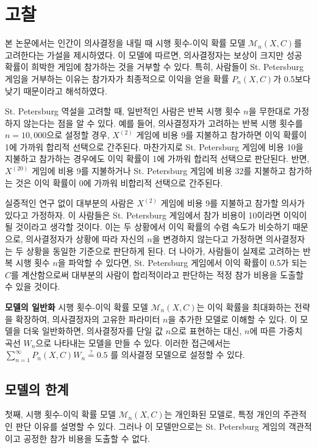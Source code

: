 \chapter{고찰}

본 논문에서는 인간이 의사결정을 내릴 때 시행 횟수-이익 확률 모델 $\mathcal{M}_n(X, C)$를 고려한다는 가설을 제시하였다. 이 모델에 따르면, 의사결정자는 보상이 크지만 성공 확률이 희박한 게임에 참가하는 것을 거부할 수 있다. 특히, 사람들이 St. Petersburg 게임을 거부하는 이유는 참가자가 최종적으로 이익을 얻을 확률 $P_n(X, C)$가 0.5보다 낮기 때문이라고 해석하였다.

St. Petersburg 역설을 고려할 때, 일반적인 사람은 반복 시행 횟수 $n$을 무한대로 가정하지 않는다는 점을 알 수 있다. 예를 들어, 의사결정자가 고려하는 반복 시행 횟수를 $n=10,000$으로 설정할 경우, $X^{(2)}$ 게임에 비용 9를 지불하고 참가하면 이익 확률이 1에 가까워 합리적 선택으로 간주된다. 마찬가지로 St. Petersburg 게임에 비용 10을 지불하고 참가하는 경우에도 이익 확률이 1에 가까워 합리적 선택으로 판단된다. 반면, $X^{(20)}$ 게임에 비용 9를 지불하거나 St. Petersburg 게임에 비용 32를 지불하고 참가하는 것은 이익 확률이 0에 가까워 비합리적 선택으로 간주된다.

실증적인 연구 없이 대부분의 사람은 $X^{(2)}$ 게임에 비용 9를 지불하고 참가할 의사가 있다고 가정하자. 이 사람들은 St. Petersburg 게임에서 참가 비용이 10이라면 이익이 될 것이라고 생각할 것이다. 이는 두 상황에서 이익 확률의 수렴 속도가 비슷하기 때문으로, 의사결정자가 상황에 따라 자신의 $n$을 변경하지 않는다고 가정하면 의사결정자는 두 상황을 동일한 기준으로 판단하게 된다. 더 나아가, 사람들이 실제로 고려하는 반복 시행 횟수 $n$을 파악할 수 있다면, St. Petersburg 게임에서 이익 확률이 0.5가 되는 $C$를 계산함으로써 대부분의 사람이 합리적이라고 판단하는 적정 참가 비용을 도출할 수 있을 것이다.

\textbf{모델의 일반화} 시행 횟수-이익 확률 모델 $\mathcal{M}_n(X, C)$는 이익 확률을 최대화하는 전략을 확장하여, 의사결정자의 고유한 파라미터 $n$을 추가한 모델로 이해할 수 있다. 이 모델을 더욱 일반화하면, 의사결정자를 단일 값 $n$으로 표현하는 대신, $n$에 따른 가중치 곡선 $W_n$으로 나타내는 모델을 만들 수 있다. 이러한 접근에서는 $\sum_{n=1}^{\infty} P_n(X, C) W_n \overset{?}{=}0.5$ 를 의사결정 모델으로 설정할 수 있다.

\section*{모델의 한계}

첫째, 시행 횟수-이익 확률 모델 $\mathcal{M}_n(X, C)$는 개인화된 모델로, 특정 개인의 주관적인 판단 이유를 설명할 수 있다. 그러나 이 모델만으로는 St. Petersburg 게임의 객관적이고 공정한 참가 비용을 도출할 수 없다.

